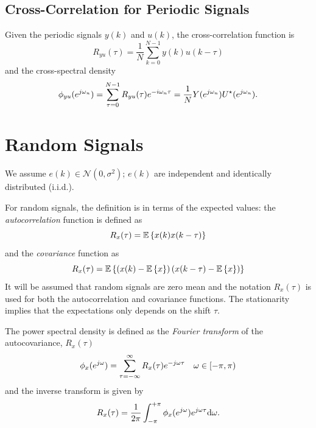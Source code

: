\subsection{Cross-Correlation for Periodic Signals}
\label{sec:crosscorrelation-periodic-signals}

Given the periodic signals $y(k)$ and $u(k)$, the cross-correlation function is
\begin{equation}
  \label{eq:cross-correlation}
  R_{yu}(\tau) = \frac{1}{N}\sum_{k=0}^{N-1} y(k)u(k-\tau)
\end{equation}
and the cross-spectral density
\begin{equation}
  \label{eq:cross-correlation-PSD}
  \phi_{yu}(e^{j\omega_n}) = \sum_{\tau=0}^{N-1} R_{yu}(\tau) e^{-i\omega_n\tau} = \frac{1}{N}Y(e^{j\omega_n})U^\star(e^{j\omega_n}).
\end{equation}


\section{Random Signals}
\label{sec:random-signals}

We assume $e(k)\in \mathcal{N}(0,\sigma^2)$; $e(k)$ are independent and identically distributed (i.i.d.).

For random signals, the definition is in terms of the expected values: the \emph{autocorrelation} function is defined as
\begin{equation*}
  R_x(\tau) = \mathbb{E}\left\{x(k)x(k-\tau)\right\}
\end{equation*}
and the \emph{covariance} function as
\begin{equation*}
  R_x(\tau) = \mathbb{E}\left\{\left(x(k) - \mathbb{E}\left\{x\right\}\right)\left(x(k-\tau)-\mathbb{E}\left\{x\right\}\right)\right\}
\end{equation*}
It will be assumed that random signals are zero mean and the notation $R_x(\tau)$ is used for both the autocorrelation and covariance functions. The stationarity implies that the expectations only depends on the shift $\tau$.

The power spectral density is defined as the \emph{Fourier transform} of the autocovariance, $R_x(\tau)$
\begin{equation*}
  \phi_x(e^{j\omega}) = \sum_{\tau=-\infty}^\infty R_x(\tau)e^{-j\omega\tau} \hspace{1em} \omega\in[-\pi,\pi)
\end{equation*}
and the inverse transform is given by
\begin{equation*}
  R_x(\tau) = \frac{1}{2\pi}\int_{-\pi}^{+\pi} \phi_x(e^{j\omega})e^{j\omega\tau}\mathrm{d} \omega.
\end{equation*}

